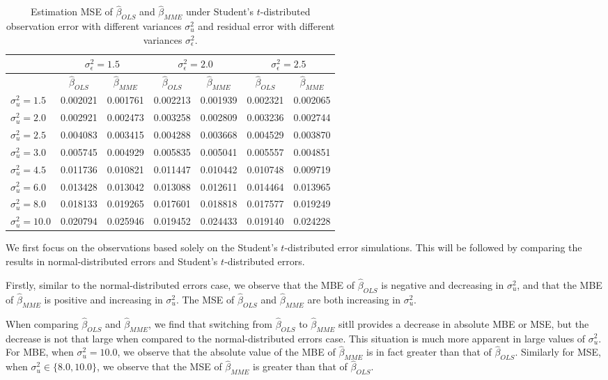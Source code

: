 \documentclass{article}
\begin{document}
\begin{table}[ht]
    \centering
    \caption{Estimation MSE of $\hat{\beta}_{OLS}$ and $\hat{\beta}_{MME}$ under Student's $t$-distributed observation error with different variances $\sigma^2_u$ and residual error with different variances $\sigma^2_\epsilon$.}
    \label{Tab:MSE_t}
    \begin{tabular}[t]{lcccccc}
        \hline
        &\multicolumn{2}{c}{$\sigma^2_\epsilon=1.5$}&\multicolumn{2}{c}{$\sigma^2_\epsilon=2.0$}&\multicolumn{2}{c}{$\sigma^2_\epsilon=2.5$}\\
        \hline
        &$\hat{\beta}_{OLS}$&$\hat{\beta}_{MME}$&$\hat{\beta}_{OLS}$&$\hat{\beta}_{MME}$&$\hat{\beta}_{OLS}$&$\hat{\beta}_{MME}$\\
        \hline
        $\sigma^2_u = 1.5$&0.002021&0.001761&0.002213&0.001939&0.002321&0.002065\\
        $\sigma^2_u = 2.0$&0.002921&0.002473&0.003258&0.002809&0.003236&0.002744\\
        $\sigma^2_u = 2.5$&0.004083&0.003415&0.004288&0.003668&0.004529&0.003870\\
        $\sigma^2_u = 3.0$&0.005745&0.004929&0.005835&0.005041&0.005557&0.004851\\
        $\sigma^2_u = 4.5$&0.011736&0.010821&0.011447&0.010442&0.010748&0.009719\\
        $\sigma^2_u = 6.0$&0.013428&0.013042&0.013088&0.012611&0.014464&0.013965\\
        $\sigma^2_u = 8.0$&0.018133&0.019265&0.017601&0.018818&0.017577&0.019249\\
        $\sigma^2_u = 10.0$&0.020794&0.025946&0.019452&0.024433&0.019140&0.024228\\
        \hline
    \end{tabular}
\end{table}

We first focus on the observations based solely on the Student's $t$-distributed error simulations. This will be followed by comparing the results in normal-distributed errors and Student's $t$-distributed errors. 

Firstly, similar to the normal-distributed errors case, we observe that the MBE of $\hat{\beta}_{OLS}$ is negative and decreasing in $\sigma^2_u$,
and that the MBE of $\hat{\beta}_{MME}$ is positive and increasing in $\sigma^2_u$.
The MSE of $\hat{\beta}_{OLS}$ and $\hat{\beta}_{MME}$ are both increasing in $\sigma^2_u$.

When comparing $\hat{\beta}_{OLS}$ and $\hat{\beta}_{MME}$,
we find that switching from $\hat{\beta}_{OLS}$ to $\hat{\beta}_{MME}$ sitll provides a decrease in absolute MBE or MSE,
but the decrease is not that large when compared to the normal-distributed errors case.
This situation is much more apparent in large values of $\sigma^2_u$.
For MBE, when $\sigma^2_u = 10.0$, we observe that the absolute value of the MBE of $\hat{\beta}_{MME}$ is in fact greater than that of $\hat{\beta}_{OLS}$.
Similarly for MSE, when $\sigma^2_u \in \{8.0, 10.0\}$, we observe that the MSE of $\hat{\beta}_{MME}$ is greater than that of $\hat{\beta}_{OLS}$.
\end{document}
